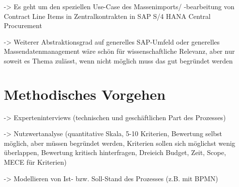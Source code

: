 -> Es geht um den speziellen Use-Case des Massenimports/ -bearbeitung von Contract Line Items in Zentralkontrakten in SAP S/4 HANA Central Procurement 

-> Weiterer Abstraktionsgrad auf generelles SAP-Umfeld oder generelles Massendatenmanagement wäre schön für wissenschaftliche Relevanz, aber nur soweit es Thema zulässt, wenn nicht möglich muss das gut begründet werden
\section{Methodisches Vorgehen}

-> Experteninterviews (technischen und geschäftlichen Part des Prozesses)


-> Nutzwertanalyse (quantitative Skala, 5-10 Kriterien, Bewertung selbst möglich, aber müssen begründet werden, Kriterien sollen sich möglichst wenig überlappen, Bewertung kritisch hinterfragen, Dreieich Budget, Zeit, Scope, MECE für Kriterien)

-> Modellieren von Ist- bzw. Soll-Stand des Prozesses (z.B. mit BPMN)